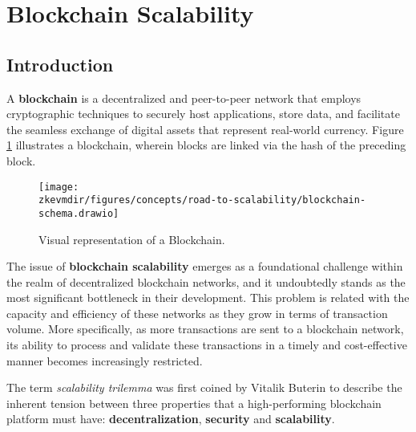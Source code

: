 

\section{Blockchain Scalability}



\subsection{Introduction}

A \textbf{blockchain} is a decentralized and peer-to-peer network that employs cryptographic techniques to securely host applications, store data, and facilitate the seamless exchange of digital assets that represent real-world currency. Figure \ref{fig:blockchain} illustrates a blockchain, wherein blocks are linked via the hash of the preceding block.

\begin{figure}[H]
\centering
\texttt{[image: \\zkevmdir/figures/concepts/road-to-scalability/blockchain-schema.drawio]}
\caption{Visual representation of a Blockchain.}
\label{fig:blockchain}
\end{figure}

The issue of \textbf{blockchain scalability} emerges as a foundational challenge within the realm of decentralized blockchain networks, and it undoubtedly stands as the most significant bottleneck in their development. This problem is related with the capacity and efficiency of these networks as they grow in terms of transaction volume. More specifically, as more transactions are sent to a blockchain network, its ability to process and validate these transactions in a timely and cost-effective manner becomes increasingly restricted.

The term \textit{scalability trilemma} was first coined by Vitalik Buterin to describe the inherent tension between three properties that a high-performing blockchain platform must have: \textbf{decentralization}, \textbf{security} and \textbf{scalability}.

